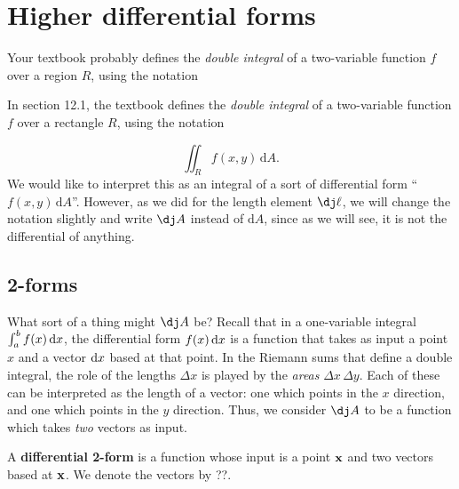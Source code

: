 \ifdefined\inmaster\else\def\subonly{\jobname}\fi

\chapter{Higher differential forms}
\label{cha:higher-forms}

\begin{notextbook}Your textbook probably defines the \emph{double integral} of a two-variable function $f$ over a region $R$, using the notation\end{notextbook}
\begin{stewart}In section 12.1, the textbook defines the \emph{double integral} of a two-variable function $f$ over a rectangle $R$, using the notation\end{stewart}
\[ \iint_R f(x,y) \,\mathrm{d}A. \]
We would like to interpret this as an integral of a sort of differential form ``$f(x,y) \,\mathrm{d}A$''.
However, as we did for the length element $\dl$, we will change the notation slightly and write $\dA$ instead of $\mathrm{d}A$, since as we will see, it is not the differential of anything.

\section{2-forms}
\label{sec:2-forms}

What sort of a thing might $\dA$ be?
Recall that in a one-variable integral $\int_a^b f(x)\,{\mathrm{d} x}$, the differential form $f(x)\,{\mathrm{d} x}$ is a function that takes as input a point $x$ and a vector ${\mathrm{d} x}$ based at that point.
In the Riemann sums that define a double integral, the role of the lengths $\Delta x$ is played by the \emph{areas} $\Delta x \,\Delta y$.
Each of these can be interpreted as the length of a vector: one which points in the $x$ direction, and one which points in the $y$ direction.
Thus, we consider $\dA$ to be a function which takes \emph{two} vectors as input.

\begin{defn}
  A \textbf{differential 2-form} is a function whose input is a point $\mathbf{x}$ and two vectors based at $\mathbf{x}$.
  We denote the vectors by ??.
\end{defn}
